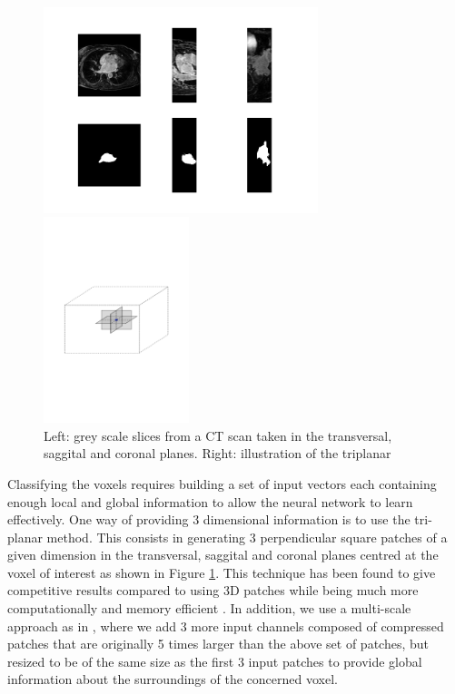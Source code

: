 \begin{figure}
\centering
\label{tri-planar}
\begin{minipage}{0.45\textwidth}
\centering
\includegraphics[trim=3cm 1.5cm 3cm 1.5cm, clip=true, height=60mm]{Chapter3/example_slice.png}
\end{minipage}\hfill
\begin{minipage}{0.45\textwidth}
\centering
\includegraphics[trim=2cm 8cm 2cm 8cm, clip=true, height=60mm]{Chapter3/triplanar.pdf}
\end{minipage}
\caption{Left: grey scale slices from a CT scan taken in the transversal, saggital and coronal planes. Right: illustration of the triplanar}
\end{figure}

\noindent Classifying the voxels requires building a set of input vectors each containing enough local and global information to allow the neural network to learn effectively. One way of providing 3 dimensional information is to use the tri-planar method. This consists in generating 3 perpendicular square patches of a given dimension in the transversal, saggital and coronal planes centred at the voxel of interest as shown in Figure \ref{tri-planar}. This technique has been found to give competitive results compared to using 3D patches while being much more computationally and memory efficient \citep{knee_cartilage}. In addition, we use a multi-scale approach as in \citep{DBLP:journals/corr/BrebissonM15}, where we add 3 more input channels composed of compressed patches that are originally 5 times larger than the above set of patches, but resized to be of the same size as the first 3 input patches to provide global information about the surroundings of the concerned voxel.\\

